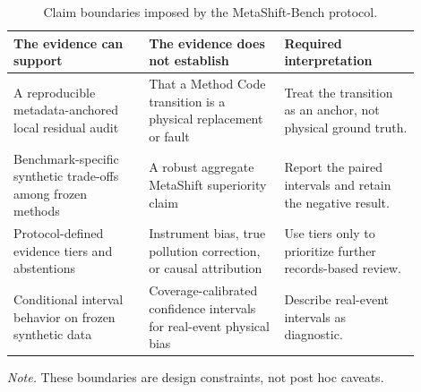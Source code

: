 \begin{table}[!htbp]
\centering
\caption{Claim boundaries imposed by the MetaShift-Bench protocol.}
\label{tab:claim-boundaries}
\scriptsize
\begin{tabular}{p{0.30\linewidth}p{0.30\linewidth}p{0.30\linewidth}}
\toprule
The evidence can support & The evidence does not establish & Required interpretation \\
\midrule
A reproducible metadata-anchored local residual audit & That a Method Code transition is a physical replacement or fault & Treat the transition as an anchor, not physical ground truth. \\
Benchmark-specific synthetic trade-offs among frozen methods & A robust aggregate MetaShift superiority claim & Report the paired intervals and retain the negative result. \\
Protocol-defined evidence tiers and abstentions & Instrument bias, true pollution correction, or causal attribution & Use tiers only to prioritize further records-based review. \\
Conditional interval behavior on frozen synthetic data & Coverage-calibrated confidence intervals for real-event physical bias & Describe real-event intervals as diagnostic. \\
\bottomrule
\end{tabular}
\par\smallskip
\begin{minipage}{0.94\linewidth}
\footnotesize\textit{Note.} These boundaries are design constraints, not post hoc caveats.
\end{minipage}
\end{table}
